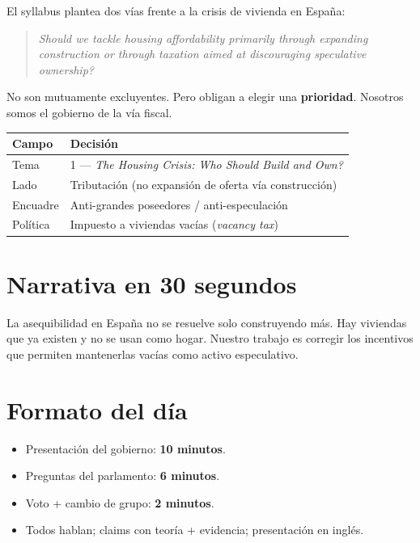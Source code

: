 \documentclass[11pt,a4paper]{report}
\begin{document}
El syllabus plantea dos v\'ias frente a la crisis de vivienda en Espa\~na:

\begin{quote}
\emph{Should we tackle housing affordability primarily through expanding construction
or through taxation aimed at discouraging speculative ownership?}
\end{quote}

No son mutuamente excluyentes. Pero obligan a elegir una \textbf{prioridad}.
Nosotros somos el gobierno de la v\'ia fiscal.

\begin{center}
\renewcommand{\arraystretch}{1.25}
\begin{tabular}{@{}ll@{}}
\toprule
\textbf{Campo} & \textbf{Decisi\'on} \\
\midrule
Tema & 1 --- \emph{The Housing Crisis: Who Should Build and Own?} \\
Lado & Tributaci\'on (no expansi\'on de oferta v\'ia construcci\'on) \\
Encuadre & Anti-grandes poseedores / anti-especulaci\'on \\
Pol\'itica & Impuesto a viviendas vac\'ias (\emph{vacancy tax}) \\
\bottomrule
\end{tabular}
\end{center}

\section{Narrativa en 30 segundos}

\begin{frase}
La asequibilidad en Espa\~na no se resuelve solo construyendo m\'as.
Hay viviendas que ya existen y no se usan como hogar.
Nuestro trabajo es corregir los incentivos que permiten mantenerlas vac\'ias
como activo especulativo.
\end{frase}

\section{Formato del d\'ia}

\begin{itemize}
  \item Presentaci\'on del gobierno: \textbf{10 minutos}.
  \item Preguntas del parlamento: \textbf{6 minutos}.
  \item Voto + cambio de grupo: \textbf{2 minutos}.
  \item Todos hablan; claims con teor\'ia + evidencia; presentaci\'on en ingl\'es.
\end{itemize}
\end{document}
